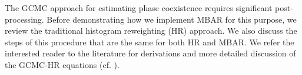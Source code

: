 \documentclass[journal=jced,manuscript=article]{achemso}
\begin{document}
%




The GCMC approach for estimating phase coexistence requires significant post-processing. Before demonstrating how we implement MBAR for this purpose, we review the traditional histogram reweighting (HR) approach. We also discuss the steps of this procedure that are the same for both HR and MBAR. We refer the interested reader to the literature for derivations and more detailed discussion of the GCMC-HR equations (cf. ).
\end{document}
